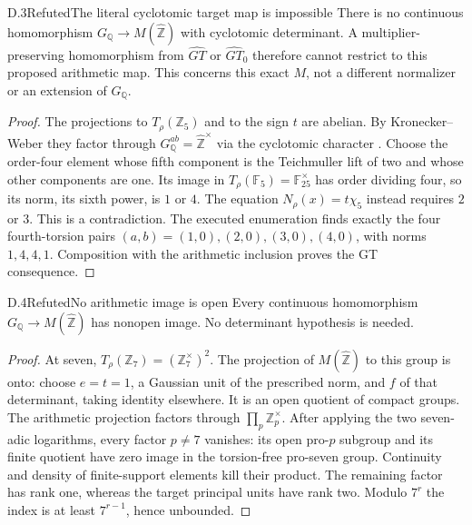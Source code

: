 \begin{statement}{D.3}{Refuted}{The literal cyclotomic target map is impossible}
There is no continuous homomorphism
$G_{\mathbb Q}\to M(\widehat{\mathbb Z})$ with cyclotomic
determinant. A multiplier-preserving homomorphism from
$\widehat{GT}$ or $\widehat{GT}_0$ therefore cannot restrict
to this proposed arithmetic map.
This concerns this exact $M$, not a different normalizer
or an extension of $G_{\mathbb Q}$.
\end{statement}
\begin{proof}
The projections to $T_\rho(\mathbb Z_5)$ and to the sign $t$
are abelian. By Kronecker--Weber they factor through
$G_{\mathbb Q}^{ab}=\widehat{\mathbb Z}^{\times}$ via the
cyclotomic character \cite[I, Theorem 4.16]{D_MilneCFT}.
Choose the order-four element whose fifth component is the
Teichmuller lift of two and whose other components are one.
Its image in $T_\rho(\mathbb F_5)=\mathbb F_{25}^{\times}$
has order dividing four, so its norm, its sixth power,
is $1$ or $4$. The equation $N_\rho(x)=t\chi_5$ instead
requires $2$ or $3$. This is a contradiction.
The executed enumeration finds exactly the four fourth-torsion
pairs $(a,b)=(1,0),(2,0),(3,0),(4,0)$, with norms $1,4,4,1$.
Composition with the arithmetic inclusion proves the GT
consequence.
\end{proof}

\begin{statement}{D.4}{Refuted}{No arithmetic image is open}
Every continuous homomorphism
$G_{\mathbb Q}\to M(\widehat{\mathbb Z})$ has nonopen image.
No determinant hypothesis is needed.
\end{statement}
\begin{proof}
At seven, $T_\rho(\mathbb Z_7)=(\mathbb Z_7^\times)^2$.
The projection of $M(\widehat{\mathbb Z})$ to this group is
onto: choose $e=t=1$, a Gaussian unit of the prescribed norm,
and $f$ of that determinant, taking identity elsewhere.
It is an open quotient of compact groups.
The arithmetic projection factors through
$\prod_p\mathbb Z_p^\times$.
After applying the two seven-adic logarithms, every factor
$p\ne7$ vanishes: its open pro-$p$ subgroup and its finite
quotient have zero image in the torsion-free pro-seven group.
Continuity and density of finite-support elements kill their
product. The remaining factor has rank one, whereas the
target principal units have rank two.
Modulo $7^r$ the index is at least $7^{r-1}$, hence unbounded.
\end{proof}

